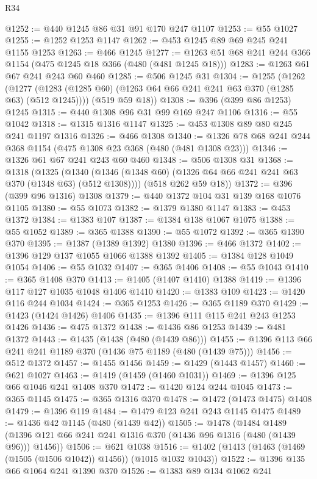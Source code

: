 \begin{lexlean}{R34}
\begin{coremodule}
@1252 := @440 @1245 @86 @31 @91 @170 @247 @1107
@1253 := @55 @1027
@1255 := @1252 @1253 @1147
@1262 := @453 @1245 @89 @69 @245 @241 @1155 @1253
@1263 := @466 @1245
@1277 := @1263 @51 @68 @241 @244 @366 @1154 (@475 @1245 @18 @366 (@480 (@481 @1245 @18)))
@1283 := @1263 @61 @67 @241 @243 @60 @460
@1285 := @506 @1245 @31
@1304 := @1255
    (@1262
      (@1277 (@1283 (@1285 @60) (@1263 @64 @66 @241 @241 @63 @370 (@1285 @63) (@512 @1245))))
      (@519 @59 @18))
@1308 := @396 (@399 @86 @1253) @1245
@1315 := @440 @1308 @96 @31 @99 @169 @247 @1106
@1316 := @55 @1042
@1318 := @1315 @1316 @1147
@1325 := @453 @1308 @89 @80 @245 @241 @1197 @1316
@1326 := @466 @1308
@1340 := @1326 @78 @68 @241 @244 @368 @1154 (@475 @1308 @23 @368 (@480 (@481 @1308 @23)))
@1346 := @1326 @61 @67 @241 @243 @60 @460
@1348 := @506 @1308 @31
@1368 := @1318
    (@1325
      (@1340 (@1346 (@1348 @60) (@1326 @64 @66 @241 @241 @63 @370 (@1348 @63) (@512 @1308))))
      (@518 @262 @59 @18))
@1372 := @396 (@399 @96 @1316) @1308
@1379 := @440 @1372 @104 @31 @139 @168 @1076 @1105
@1380 := @55 @1073
@1382 := @1379 @1380 @1147
@1383 := @453 @1372
@1384 := @1383 @107
@1387 := @1384 @138 @1067 @1075
@1388 := @55 @1052
@1389 := @365 @1388
@1390 := @55 @1072
@1392 := @365 @1390 @370
@1395 := @1387 (@1389 @1392) @1380
@1396 := @466 @1372
@1402 := @1396 @129 @137 @1055 @1066 @1388 @1392
@1405 := @1384 @128 @1049 @1054
@1406 := @55 @1032
@1407 := @365 @1406
@1408 := @55 @1043
@1410 := @365 @1408 @370
@1413 := @1405 (@1407 @1410) @1388
@1419 := @1396 @117 @127 @1035 @1048 @1406 @1410
@1420 := @1383 @109
@1423 := @1420 @116 @244 @1034
@1424 := @365 @1253
@1426 := @365 @1189 @370
@1429 := @1423 (@1424 @1426) @1406
@1435 := @1396 @111 @115 @241 @243 @1253 @1426
@1436 := @475 @1372
@1438 := @1436 @86 @1253
@1439 := @481 @1372
@1443 := @1435 (@1438 (@480 (@1439 @86)))
@1455 := @1396 @113 @66 @241 @241 @1189 @370 (@1436 @75 @1189 (@480 (@1439 @75)))
@1456 := @512 @1372
@1457 := @1455 @1456
@1459 := @1429 (@1443 @1457)
@1460 := @621 @1027
@1463 := @1419 (@1459 (@1460 @1031))
@1469 := @1396 @125 @66 @1046 @241 @1408 @370
@1472 := @1420 @124 @244 @1045
@1473 := @365 @1145
@1475 := @365 @1316 @370
@1478 := @1472 (@1473 @1475) @1408
@1479 := @1396 @119
@1484 := @1479 @123 @241 @243 @1145 @1475
@1489 := @1436 @42 @1145 (@480 (@1439 @42))
@1505 := @1478
    (@1484 @1489 (@1396 @121 @66 @241 @241 @1316 @370 (@1436 @96 @1316 (@480 (@1439 @96))) @1456))
@1506 := @621 @1038
@1516 := @1402 (@1413 (@1463 (@1469 (@1505 (@1506 @1042)) @1456)) (@1015 @1032 @1043))
@1522 := @1396 @135 @66 @1064 @241 @1390 @370
@1526 := @1383 @89 @134 @1062 @241

\end{coremodule}
\end{lexlean}
